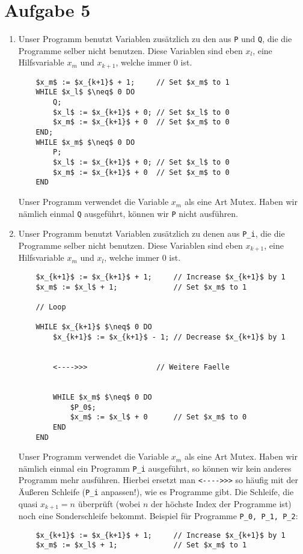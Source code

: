 \documentclass[a4paper,11pt]{scrartcl}
\begin{document}
	\section*{Aufgabe 5}
	\begin{enumerate}[label=\alph*)]
	\item	Unser Programm benutzt Variablen zusätzlich zu den aus \verb|P| und \verb|Q|, die die Programme selber nicht benutzen. Diese Variablen sind eben $x_l$, eine Hilfsvariable $x_m$ und $x_{k+1}$, welche immer $0$ ist.
	\begin{lstlisting}
	$x_m$ := $x_{k+1}$ + 1;		// Set $x_m$ to 1
	WHILE $x_l$ $\neq$ 0 DO
		Q;
		$x_l$ := $x_{k+1}$ + 0;	// Set $x_l$ to 0
		$x_m$ := $x_{k+1}$ + 0	// Set $x_m$ to 0
	END;
	WHILE $x_m$ $\neq$ 0 DO
		P;
		$x_l$ := $x_{k+1}$ + 0;	// Set $x_l$ to 0
		$x_m$ := $x_{k+1}$ + 0	// Set $x_m$ to 0
	END
	\end{lstlisting}
	Unser Programm verwendet die Variable $x_m$ als eine Art Mutex. Haben wir nämlich einmal \verb|Q| ausgeführt, können wir \verb|P| nicht ausführen.
	
	\newpage	
	
	\item	Unser Programm benutzt Variablen zusätzlich zu denen aus \verb|P_i|, die die Programme selber nicht benutzen. Diese Variablen sind eben $x_{k+1}$, eine Hilfsvariable $x_m$ und $x_l$, welche immer $0$ ist.
	\begin{lstlisting}
	$x_{k+1}$ := $x_{k+1}$ + 1;		// Increase $x_{k+1}$ by 1
	$x_m$ := $x_l$ + 1;				// Set $x_m$ to 1
	
	// Loop	
	
	WHILE $x_{k+1}$ $\neq$ 0 DO
		$x_{k+1}$ := $x_{k+1}$ - 1;	// Decrease $x_{k+1}$ by 1
		
		
		<---->>>				// Weitere Faelle
		
		
		WHILE $x_m$ $\neq$ 0 DO
			$P_0$;
			$x_m$ := $x_l$ + 0		// Set $x_m$ to 0
		END
	END
	\end{lstlisting}
	Unser Programm verwendet die Variable $x_m$ als eine Art Mutex. Haben wir nämlich einmal ein Programm \verb|P_i| ausgeführt, so können wir kein anderes Programm mehr ausführen.
	Hierbei ersetzt man \verb|<---->>>| so häufig mit der Äußeren Schleife (\verb|P_i| anpassen!), wie es Programme gibt. Die Schleife, die quasi $x_{k+1} = n$ überprüft (wobei $n$ der höchste Index der Programme ist) noch eine Sonderschleife bekommt.
	Beispiel für Programme \verb|P_0, P_1, P_2|:
	\begin{lstlisting}
	$x_{k+1}$ := $x_{k+1}$ + 1;		// Increase $x_{k+1}$ by 1
	$x_m$ := $x_l$ + 1;				// Set $x_m$ to 1
	

\end{lstlisting}
\end{enumerate}
\end{document}
